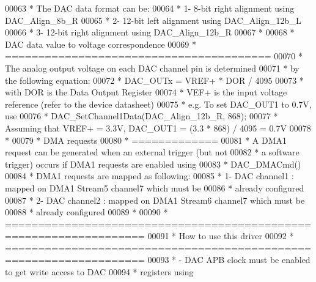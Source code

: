\begin{DoxyCode}
00063 \textcolor{comment}{  *          The DAC data format can be:}
00064 \textcolor{comment}{  *             1- 8-bit right alignment using DAC\_Align\_8b\_R}
00065 \textcolor{comment}{  *             2- 12-bit left alignment using DAC\_Align\_12b\_L}
00066 \textcolor{comment}{  *             3- 12-bit right alignment using DAC\_Align\_12b\_R}
00067 \textcolor{comment}{  *}
00068 \textcolor{comment}{  *          DAC data value to voltage correspondence  }
00069 \textcolor{comment}{  *          ========================================  }
00070 \textcolor{comment}{  *          The analog output voltage on each DAC channel pin is determined}
00071 \textcolor{comment}{  *          by the following equation: }
00072 \textcolor{comment}{  *          DAC\_OUTx = VREF+ * DOR / 4095}
00073 \textcolor{comment}{  *          with  DOR is the Data Output Register}
00074 \textcolor{comment}{  *                VEF+ is the input voltage reference (refer to the device datasheet)}
00075 \textcolor{comment}{  *          e.g. To set DAC\_OUT1 to 0.7V, use}
00076 \textcolor{comment}{  *            DAC\_SetChannel1Data(DAC\_Align\_12b\_R, 868);}
00077 \textcolor{comment}{  *          Assuming that VREF+ = 3.3V, DAC\_OUT1 = (3.3 * 868) / 4095 = 0.7V}
00078 \textcolor{comment}{  *}
00079 \textcolor{comment}{  *          DMA requests }
00080 \textcolor{comment}{  *          =============    }
00081 \textcolor{comment}{  *          A DMA1 request can be generated when an external trigger (but not}
00082 \textcolor{comment}{  *          a software trigger) occurs if DMA1 requests are enabled using}
00083 \textcolor{comment}{  *          DAC\_DMACmd()}
00084 \textcolor{comment}{  *          DMA1 requests are mapped as following:}
00085 \textcolor{comment}{  *             1- DAC channel1 : mapped on DMA1 Stream5 channel7 which must be }
00086 \textcolor{comment}{  *                               already configured}
00087 \textcolor{comment}{  *             2- DAC channel2 : mapped on DMA1 Stream6 channel7 which must be }
00088 \textcolor{comment}{  *                               already configured}
00089 \textcolor{comment}{  *}
00090 \textcolor{comment}{  *          ===================================================================      }
00091 \textcolor{comment}{  *                              How to use this driver }
00092 \textcolor{comment}{  *          ===================================================================          }
00093 \textcolor{comment}{  *            - DAC APB clock must be enabled to get write access to DAC}
00094 \textcolor{comment}{  *              registers using}

\end{DoxyCode}
